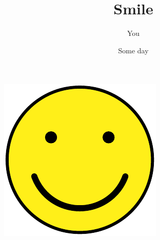 \documentclass{article}
\title{Smile}
\author{You}
\date{Some day}
\begin{document}
    \maketitle

    \includegraphics{smile.pdf}

    
\end{document}
